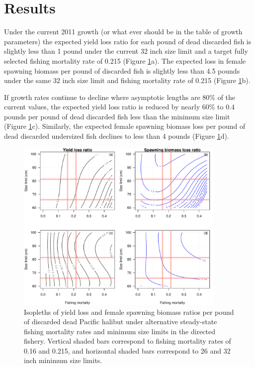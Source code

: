 \documentclass[12pt]{article}
\begin{document}
\section{Results} %
\label{sec:results}
Under the current 2011 growth (or what ever should be in the table of growth parameters) the expected yield loss ratio for each pound of dead discarded fish is slightly less than 1 pound under the current 32 inch size limit and a target fully selected fishing mortality rate of 0.215 (Figure \ref{fig:fig:Halitosis:SlowGrowth}a).  The expected loss in female spawning biomass per pound of discarded fish is slightly less than 4.5 pounds under the same 32 inch size limit and fishing mortality rate of 0.215 (Figure \ref{fig:fig:Halitosis:SlowGrowth}b).

If growth rates continue to decline where asymptotic lengths are 80\% of the current values, the expected yield loss ratio is reduced by nearly 60\% to 0.4 pounds per pound of dead discarded fish less than the minimum size limit (Figure \ref{fig:fig:Halitosis:SlowGrowth}c).  Similarly, the expected female spawning biomass loss per pound of dead discarded undersized fish declines to less than 4 pounds (Figure \ref{fig:fig:Halitosis:SlowGrowth}d).

\begin{figure}[htbp]
	\centering
		\includegraphics[width=0.9\textwidth]{fig:Halitosis:SlowGrowth.pdf}
	\caption{Isopleths of yield loss and female spawning biomass ratios per pound of discarded dead Pacific halibut under alternative steady-state fishing mortality rates and minimum size limits in the directed fishery.  Vertical shaded bars correspond to fishing mortality rates of 0.16 and 0.215, and horizontal shaded bars correspond to 26 and 32 inch minimum size limits.}
	\label{fig:fig:Halitosis:SlowGrowth}
\end{figure}




\end{document}
